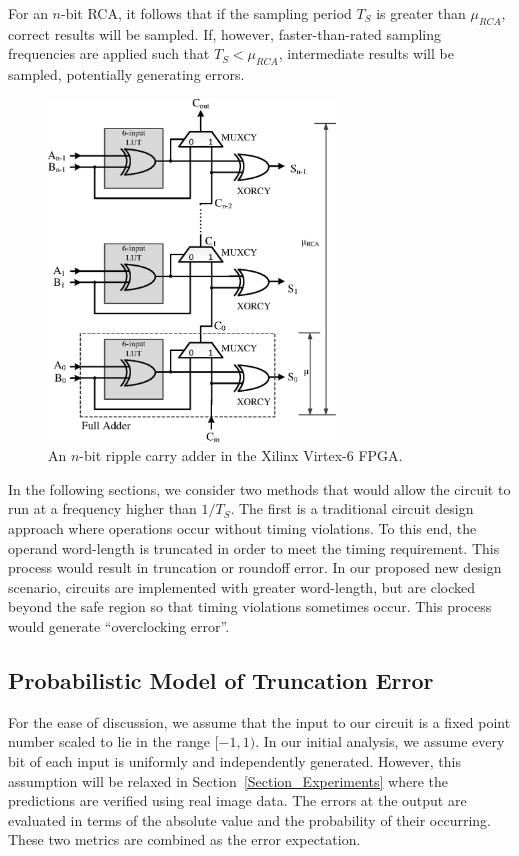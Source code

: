 \documentclass[prodmode,acmtrets]{acmsmall} %
\begin{document}
For an $n$-bit RCA, it follows that if the sampling period $T_S$ is greater than $\mu_{RCA}$, correct results will be sampled. If, however, faster-than-rated sampling frequencies are applied such that $T_S<\mu_{RCA}$, intermediate results will be sampled, potentially generating errors.

\begin{figure}[t]
  \centering
  \includegraphics[width=3in]{./Figures/FastCarryLogic3.eps}
  \caption{An $n$-bit ripple carry adder in the Xilinx Virtex-6 FPGA.}
  \label{FPGA adder}
\end{figure}

In the following sections, we consider two methods that would allow the circuit to run at a frequency higher than $1/{T_S}$. The first is a traditional circuit design approach where operations occur without timing violations. To this end, the operand word-length is truncated in order to meet the timing requirement. This process would result in truncation or roundoff error. In our proposed new design scenario, circuits are implemented with greater word-length, but are clocked beyond the safe region so that timing violations sometimes occur. This process would generate ``overclocking error''.

\subsection{Probabilistic Model of Truncation Error}\label{section_RCA_TruncationError}
For the ease of discussion, we assume that the input to our circuit is a fixed point number scaled to lie in the range $[-1,1)$. In our initial analysis, we assume every bit of each input is uniformly and independently generated. However, this assumption will be relaxed in Section~\ref{Section_Experiments} where the predictions are verified using real image data. The errors at the output are evaluated in terms of the absolute value and the probability of their occurring. These two metrics are combined as the error expectation.
\end{document}
